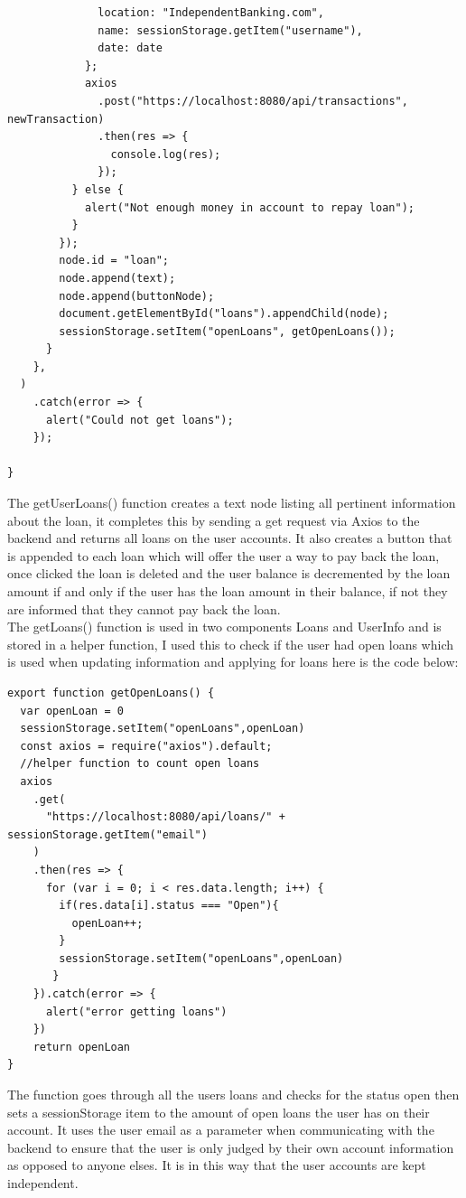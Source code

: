 \begin{verbatim}
              location: "IndependentBanking.com",
              name: sessionStorage.getItem("username"),
              date: date
            };
            axios
              .post("https://localhost:8080/api/transactions", newTransaction)
              .then(res => {
                console.log(res);
              });
          } else {
            alert("Not enough money in account to repay loan");
          }
        });
        node.id = "loan";
        node.append(text);
        node.append(buttonNode);
        document.getElementById("loans").appendChild(node);
        sessionStorage.setItem("openLoans", getOpenLoans());
      }
    },
  )
    .catch(error => {
      alert("Could not get loans");
    });

}
\end{verbatim}
The getUserLoans() function creates a text node listing all pertinent information about the loan, it completes this by sending a get request via Axios to the backend and returns all loans on the user accounts.  It also creates a button that is appended to each loan which will offer the user a way to pay back the loan, once clicked the loan is deleted and the user balance is decremented by the loan amount if and only if the user has the loan amount in their balance, if not they are informed that they cannot pay back the loan.
\\
The getLoans() function is used in two components Loans and UserInfo and is stored in a helper function, I used this to check if the user had open loans which is used when updating information and applying for loans here is the code below:
\begin{verbatim}
export function getOpenLoans() {
  var openLoan = 0
  sessionStorage.setItem("openLoans",openLoan)
  const axios = require("axios").default;
  //helper function to count open loans
  axios
    .get(
      "https://localhost:8080/api/loans/" + sessionStorage.getItem("email")
    )
    .then(res => {
      for (var i = 0; i < res.data.length; i++) {
        if(res.data[i].status === "Open"){
          openLoan++;
        }
        sessionStorage.setItem("openLoans",openLoan)
       }
    }).catch(error => {
      alert("error getting loans")
    })
    return openLoan
}

\end{verbatim}
The function goes through all the users loans and checks for the status open then sets a sessionStorage item to the amount of open loans the user has on their account.  It uses the user email as a parameter when communicating with the backend to ensure that the user is only judged by their own account information as opposed to anyone elses.  It is in this way that the user accounts are kept independent.
